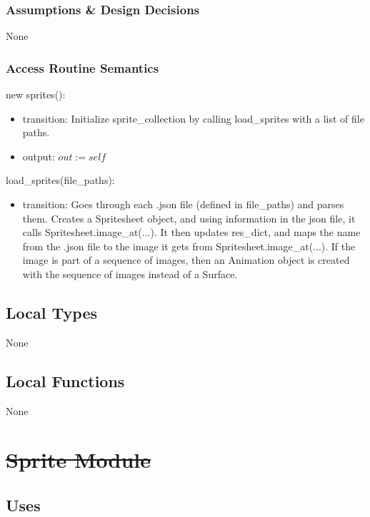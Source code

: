 \documentclass[12pt]{article}
\begin{document}
\subsubsection* {Assumptions \& Design Decisions}

None

\subsubsection* {Access Routine Semantics}

new sprites():
\begin{itemize}
    \item transition: Initialize sprite\_collection by calling load\_sprites with a list of file paths.
    \item output: $out := self$
\end{itemize}

load\_sprites(file\_paths):
\begin{itemize}
    \item transition: Goes through each .json file (defined in file\_paths) and parses them. Creates a Spritesheet object, and using information in the json file, it calls Spritesheet.image\_at(...). It then updates res\_dict, and maps the name from the .json file to the image it gets from Spritesheet.image\_at(...). If the image is part of a sequence of images, then an Animation object is created with the sequence of images instead of a Surface.
    
\end{itemize}

\subsection* {Local Types}

None

\subsection* {Local Functions}

None

\newpage



\section* {\st{Sprite Module}}

\subsection* {Uses}
\end{document}
